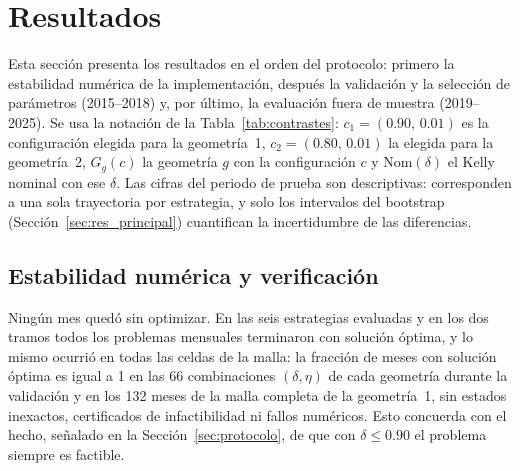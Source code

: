 
\section{Resultados}\label{sec:resultados}

Esta sección presenta los resultados en el orden del protocolo: primero la estabilidad numérica de la implementación, después la validación y la selección de parámetros (2015--2018) y, por último, la evaluación fuera de muestra (2019--2025). Se usa la notación de la Tabla~\ref{tab:contrastes}: $c_1=(0.90,\,0.01)$ es la configuración elegida para la geometría~1, $c_2=(0.80,\,0.01)$ la elegida para la geometría~2, $G_g(c)$ la geometría $g$ con la configuración $c$ y $\mathrm{Nom}(\delta)$ el Kelly nominal con ese $\delta$. Las cifras del periodo de prueba son descriptivas: corresponden a una sola trayectoria por estrategia, y solo los intervalos del bootstrap (Sección~\ref{sec:res_principal}) cuantifican la incertidumbre de las diferencias.

\subsection{Estabilidad numérica y verificación}\label{sec:res_estabilidad}

Ningún mes quedó sin optimizar. En las seis estrategias evaluadas y en los dos tramos todos los problemas mensuales terminaron con solución óptima, y lo mismo ocurrió en todas las celdas de la malla: la fracción de meses con solución óptima es igual a 1 en las 66 combinaciones $(\delta,\eta)$ de cada geometría durante la validación y en los 132 meses de la malla completa de la geometría~1, sin estados inexactos, certificados de infactibilidad ni fallos numéricos. Esto concuerda con el hecho, señalado en la Sección~\ref{sec:protocolo}, de que con $\delta\le 0.90$ el problema siempre es factible.

